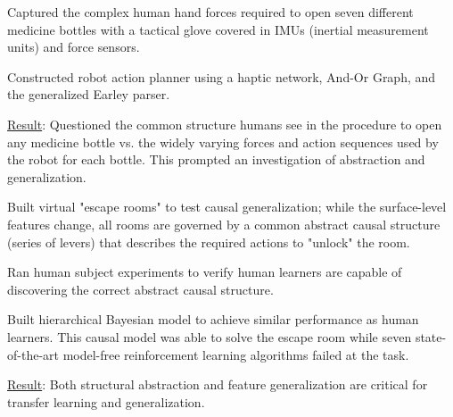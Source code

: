 \begin{cventries}
{\begin{justify}
\end{justify}
%
\begin{justify}
\end{justify}
\vspace{-1mm}
\begin{cvitems}
  \item Captured the complex human hand forces required to open seven different medicine bottles with a tactical glove covered in IMUs (inertial measurement units) and force sensors.
  \item Constructed robot action planner using a haptic network, And-Or Graph, and the generalized Earley parser.
  \item \underline{Result}: Questioned the common structure humans see in the procedure to open any medicine bottle vs. the widely varying forces and action sequences used by the robot for each bottle. This prompted an investigation of abstraction and generalization.
\end{cvitems}
%
\begin{justify}
\end{justify}
\vspace{-1mm}
\begin{cvitems}
  \item Built virtual "escape rooms" to test causal generalization; while the surface-­level features change, all rooms are governed by a common abstract causal structure (series of levers) that describes the required actions to "unlock" the room.
  \item Ran human subject experiments to verify human learners are capable of discovering the correct abstract causal structure.
  \item Built hierarchical Bayesian model to achieve similar performance as human learners.  This causal model was able to solve the escape room while seven state-of-the-art model-free reinforcement learning algorithms failed at the task.
  \item \underline{Result}: Both structural abstraction and feature generalization are critical for transfer learning and generalization.
\end{cvitems}
%
\begin{justify}
\end{justify}
}
\end{cventries}
